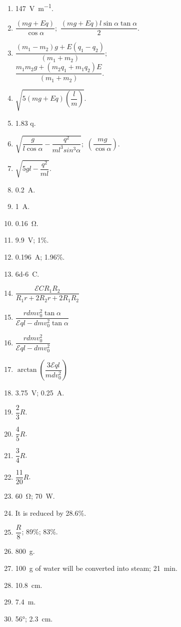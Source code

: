 \documentclass[a4paper,sfsidenotes]{tufte-book}
\newcommand{\Ea}{\mathcal{E}}
\begin{document}
\begin{enumerate}[label=\arabic*.]
\item \SI[per-mode=symbol]{147}{\volt\per\metre}.
\item  $\dfrac{(mg+ Eq)}{\cos \alpha}; \,\, \dfrac{(mg+Eq) l \sin \alpha \tan \alpha}{2}.$
\item $\dfrac{(m_{1} - m_{2})g+E(q_{1}-q_{2})}{(m_{1} + m_{2})};$\\
$\dfrac{m_{1} m_{2}g + (m_{2}q_{1} +  m_{1}q_{2} )E}{(m_{1} + m_{2})}.$
\item $\sqrt{5\left( mg +Eq \right) \left( \dfrac{l}{m} \right)}$.
\item 1.83 q.
\item $\sqrt{\dfrac{g}{l \cos \alpha} - \dfrac{q^{2}}{ml^{3} sin^{3} \alpha}};\,\, \left( \dfrac{mg}{\cos \alpha} \right)$.
\item $\sqrt{5gl - \dfrac{q^{2}}{ml}}$.
\item \SI{0.2}{\ampere}.
\item \SI{1}{\ampere}.
\item \SI{0.16}{\ohm}.
\item \SI{9.9}{\volt}; 1\%.
\item \SI{0.196}{\ampere}; 1.96\%.
\item \SI{6d-6}{\coulomb}.
\item $\dfrac{\Ea C R_{1}R_{2}}{R_{1}r+2R_{2}r+2R_{1}R_{2}}$
\item $\dfrac{rdmv_{0}^{2} \tan \alpha}{\Ea ql - dmv_{0}^{2} \tan \alpha}$
\item $\dfrac{rdmv_{0}^{2}}{\Ea ql - dmv_{0}^{2}}$
\item $\arctan \left( \dfrac{3 \Ea ql }{mdv_{0}^{2}} \right)$
\item \SI{3.75}{\volt}; \SI{0.25}{\ampere}.
\item $\dfrac{2}{3} R$.
\item $\dfrac{4}{5} R$.
\item $\dfrac{3}{4} R$.
\item $\dfrac{11}{20} R$.
\item \SI{60}{\ohm}; \SI{70}{\watt}.
\item It is reduced by 28.6\%.
\item $\dfrac{R}{8}$; 89\%; 83\%.
\item \SI{800}{\gram}.
\item \SI{100}{\gram} of water will be converted into steam; \SI{21}{\minute}.
\item \SI{10.8}{\centi\metre}.
\item \SI{7.4}{\metre}.
\item \ang{56}; \SI{2.3}{\centi\metre}.

\end{enumerate}
\end{document}
